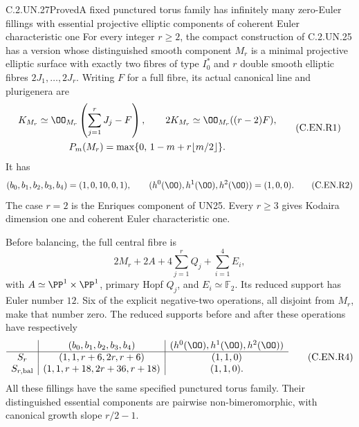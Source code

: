 \begin{statement}{C.2.UN.27}{Proved}{A fixed punctured torus family has infinitely many zero-Euler fillings with essential projective elliptic components of coherent Euler characteristic one}
For every integer $r\ge2$, the compact construction
of C.2.UN.25 has a version whose distinguished smooth
component $M_r$ is a minimal projective elliptic
surface with exactly two fibres of type $I_0^*$
and $r$ double smooth elliptic fibres $2J_1,\ldots,2J_r$.
Writing $F$ for a full fibre, its actual canonical
line and plurigenera are
\[
 \begin{gathered}
 K_{M_r}\simeq\OO_{M_r}\left(\sum_{j=1}^rJ_j-F\right),
 \qquad
 2K_{M_r}\simeq\OO_{M_r}((r-2)F),
 \\
 P_m(M_r)=\max\{0,\,1-m+r\lfloor m/2\rfloor\}.
 \end{gathered}
                                                               \tag{C.EN.R1}
\]
It has
\[
 (b_0,b_1,b_2,b_3,b_4)=(1,0,10,0,1),\qquad
 (h^0(\OO),h^1(\OO),h^2(\OO))=(1,0,0).
                                                               \tag{C.EN.R2}
\]
The case $r=2$ is the Enriques component of UN25.
Every $r\ge3$ gives Kodaira dimension one and
coherent Euler characteristic one.

Before balancing, the full central fibre is
\[
 2M_r+2A+4\sum_{j=1}^r Q_j+\sum_{i=1}^4E_i,
                                                               \tag{C.EN.R3}
\]
with $A\simeq\PP^1\times\PP^1$, primary Hopf
$Q_j$, and $E_i\simeq\mathbb F_2$.
Its reduced support has Euler number $12$.
Six of the explicit negative-two operations,
all disjoint from $M_r$, make that number zero.
The reduced supports before and after these
operations have respectively
\[
 \begin{array}{c|c|c}
 &(b_0,b_1,b_2,b_3,b_4)&(h^0(\OO),h^1(\OO),h^2(\OO))\\ \hline
 S_r&(1,1,r+6,2r,r+6)&(1,1,0)\\
 S_{r,\mathrm{bal}}&(1,1,r+18,2r+36,r+18)&(1,1,0).
 \end{array}                                             \tag{C.EN.R4}
\]
All these fillings have the same specified punctured
torus family. Their distinguished essential components
are pairwise non-bimeromorphic, with canonical growth
slope $r/2-1$.
\end{statement}
